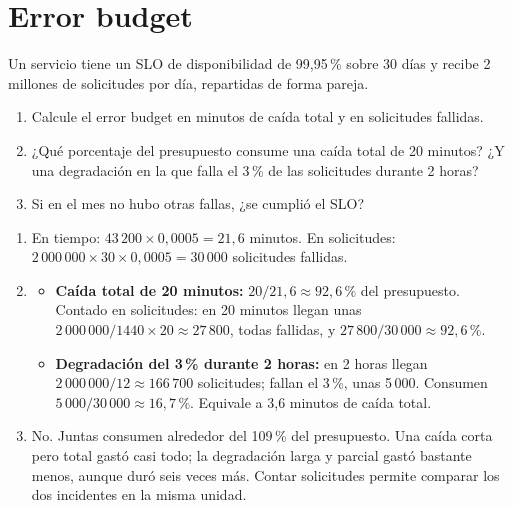 \documentclass[variant=guia,cover=institutional,mode=screen]{ua-engineering-v6-article}
\begin{document}
\section{Error budget}
\begin{uaexercise}
Un servicio tiene un SLO de disponibilidad de 99,95\,\% sobre 30 días y recibe 2 millones de solicitudes por día, repartidas de forma pareja.
\begin{enumerate}
\item Calcule el error budget en minutos de caída total y en solicitudes fallidas.
\item ¿Qué porcentaje del presupuesto consume una caída total de 20 minutos? ¿Y una degradación en la que falla el 3\,\% de las solicitudes durante 2 horas?
\item Si en el mes no hubo otras fallas, ¿se cumplió el SLO?
\end{enumerate}
\end{uaexercise}
\begin{uaanswer}
\begin{enumerate}
\item En tiempo: $43\,200 \times 0{,}0005 = 21{,}6$ minutos. En solicitudes: $2\,000\,000 \times 30 \times 0{,}0005 = 30\,000$ solicitudes fallidas.
\item \begin{itemize}
\item \textbf{Caída total de 20 minutos:} $20 / 21{,}6 \approx 92{,}6\,\%$ del presupuesto. Contado en solicitudes: en 20 minutos llegan unas $2\,000\,000 / 1440 \times 20 \approx 27\,800$, todas fallidas, y $27\,800 / 30\,000 \approx 92{,}6\,\%$.
\item \textbf{Degradación del 3\,\% durante 2 horas:} en 2 horas llegan $2\,000\,000 / 12 \approx 166\,700$ solicitudes; fallan el 3\,\%, unas 5\,000. Consumen $5\,000 / 30\,000 \approx 16{,}7\,\%$. Equivale a 3,6 minutos de caída total.
\end{itemize}
\item No. Juntas consumen alrededor del 109\,\% del presupuesto. Una caída corta pero total gastó casi todo; la degradación larga y parcial gastó bastante menos, aunque duró seis veces más. Contar solicitudes permite comparar los dos incidentes en la misma unidad.
\end{enumerate}
\end{uaanswer}
\end{document}
